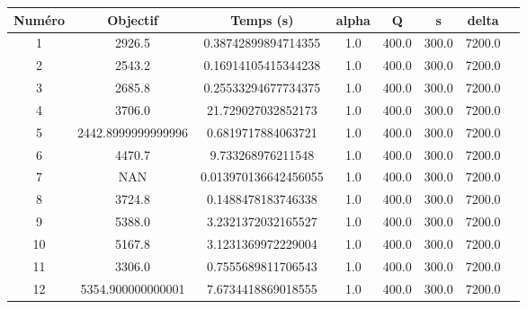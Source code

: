 \begin{tabular}{|c|c|c|c|c|c|c|c|}
\hline
 Numéro & Objectif & Temps (s) & alpha & Q & s & delta \\
\hline
1 & 2926.5 & 0.38742899894714355 & 1.0 & 400.0 & 300.0 & 7200.0 \\ 
 \hline
2 & 2543.2 & 0.16914105415344238 & 1.0 & 400.0 & 300.0 & 7200.0 \\ 
 \hline
3 & 2685.8 & 0.25533294677734375 & 1.0 & 400.0 & 300.0 & 7200.0 \\ 
 \hline
4 & 3706.0 & 21.729027032852173 & 1.0 & 400.0 & 300.0 & 7200.0 \\ 
 \hline
5 & 2442.8999999999996 & 0.6819717884063721 & 1.0 & 400.0 & 300.0 & 7200.0 \\ 
 \hline
6 & 4470.7 & 9.733268976211548 & 1.0 & 400.0 & 300.0 & 7200.0 \\ 
 \hline
7 & NAN & 0.013970136642456055 & 1.0 & 400.0 & 300.0 & 7200.0 \\ 
 \hline
8 & 3724.8 & 0.1488478183746338 & 1.0 & 400.0 & 300.0 & 7200.0 \\ 
 \hline
9 & 5388.0 & 3.2321372032165527 & 1.0 & 400.0 & 300.0 & 7200.0 \\ 
 \hline
10 & 5167.8 & 3.1231369972229004 & 1.0 & 400.0 & 300.0 & 7200.0 \\ 
 \hline
11 & 3306.0 & 0.7555689811706543 & 1.0 & 400.0 & 300.0 & 7200.0 \\ 
 \hline
12 & 5354.900000000001 & 7.6734418869018555 & 1.0 & 400.0 & 300.0 & 7200.0 \\ 
 \hline
\end{tabular}
